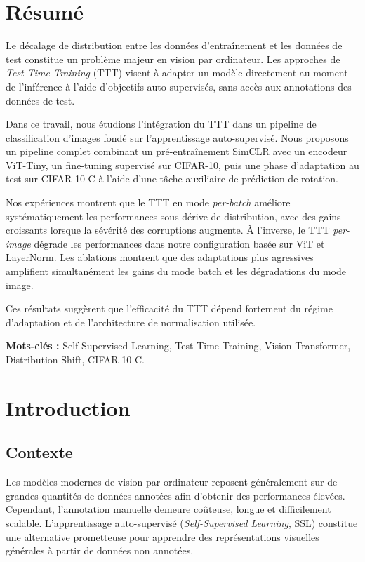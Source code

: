 \documentclass[12pt,a4paper]{report}
\begin{document}
	\chapter*{Résumé}
	
	Le décalage de distribution entre les données d'entraînement et les données de test constitue un problème majeur en vision par ordinateur. Les approches de \emph{Test-Time Training} (TTT) visent à adapter un modèle directement au moment de l'inférence à l'aide d'objectifs auto-supervisés, sans accès aux annotations des données de test.
	
	Dans ce travail, nous étudions l'intégration du TTT dans un pipeline de classification d'images fondé sur l'apprentissage auto-supervisé. Nous proposons un pipeline complet combinant un pré-entraînement SimCLR avec un encodeur ViT-Tiny, un fine-tuning supervisé sur CIFAR-10, puis une phase d'adaptation au test sur CIFAR-10-C à l'aide d'une tâche auxiliaire de prédiction de rotation.
	
	Nos expériences montrent que le TTT en mode \emph{per-batch} améliore systématiquement les performances sous dérive de distribution, avec des gains croissants lorsque la sévérité des corruptions augmente. À l'inverse, le TTT \emph{per-image} dégrade les performances dans notre configuration basée sur ViT et LayerNorm. Les ablations montrent que des adaptations plus agressives amplifient simultanément les gains du mode batch et les dégradations du mode image.
	
	Ces résultats suggèrent que l'efficacité du TTT dépend fortement du régime d'adaptation et de l'architecture de normalisation utilisée.
	\vspace{1em}
	
	\textbf{Mots-clés :}
	Self-Supervised Learning, Test-Time Training, Vision Transformer, Distribution Shift, CIFAR-10-C.
	
	\chapter{Introduction}
	
	\section{Contexte}
	Les modèles modernes de vision par ordinateur reposent généralement sur de grandes quantités de données annotées afin d'obtenir des performances élevées. Cependant, l’annotation manuelle demeure coûteuse, longue et difficilement scalable. L’apprentissage auto-supervisé (\emph{Self-Supervised Learning}, SSL) constitue une alternative prometteuse pour apprendre des représentations visuelles générales à partir de données non annotées.
	
\end{document}

